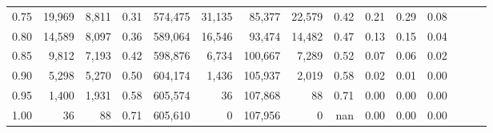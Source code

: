 \begin{tabular}{rrrrrrrrrrrrrrr}
0.75 &  19,969 &  8,811 &  0.31 &  574,475 &   31,135 &   85,377 &   22,579 &  0.42 &  0.21 &  0.29 &      0.08 \\
0.80 &  14,589 &  8,097 &  0.36 &  589,064 &   16,546 &   93,474 &   14,482 &  0.47 &  0.13 &  0.15 &      0.04 \\
0.85 &   9,812 &  7,193 &  0.42 &  598,876 &    6,734 &  100,667 &    7,289 &  0.52 &  0.07 &  0.06 &      0.02 \\
0.90 &   5,298 &  5,270 &  0.50 &  604,174 &    1,436 &  105,937 &    2,019 &  0.58 &  0.02 &  0.01 &      0.00 \\
0.95 &   1,400 &  1,931 &  0.58 &  605,574 &       36 &  107,868 &       88 &  0.71 &  0.00 &  0.00 &      0.00 \\
1.00 &      36 &     88 &  0.71 &  605,610 &        0 &  107,956 &        0 &   nan &  0.00 &  0.00 &      0.00 \\
\bottomrule
\end{tabular}
